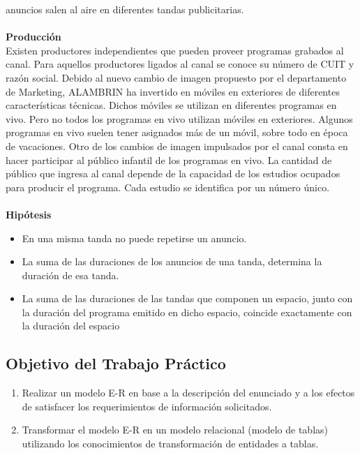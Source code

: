 \documentclass[a4paper,10pt,titlepage]{article}
\begin{document}
anuncios salen al aire en diferentes tandas publicitarias.\\
\\ \textbf{Producci\'on}\\
Existen productores independientes que pueden proveer programas grabados al canal. Para aquellos
productores ligados al canal se conoce su n\'umero de CUIT y raz\'on social.
Debido al nuevo cambio de imagen propuesto por el departamento de Marketing, ALAMBRIN ha invertido en
m\'oviles en exteriores de diferentes características t\'ecnicas. Dichos m\'oviles se utilizan en diferentes programas
en vivo. Pero no todos los programas en vivo utilizan m\'oviles en exteriores. Algunos programas en vivo suelen
tener asignados m\'as de un m\'ovil, sobre todo en \'epoca de vacaciones.
Otro de los cambios de imagen impulsados por el canal consta en hacer participar al p\'ublico infantil de los
programas en vivo. La cantidad de p\'ublico que ingresa al canal depende de la capacidad de los estudios
ocupados para producir el programa. Cada estudio se identifica por un n\'umero \'unico.\\
\\
 \textbf{Hip\'otesis}
\begin{itemize}
\item En una misma tanda no puede repetirse un anuncio.
\item La suma de las duraciones de los anuncios de una tanda, determina la duraci\'on de esa tanda.
\item La suma de las duraciones de las tandas que componen un espacio, junto con la duraci\'on del programa
emitido en dicho espacio, coincide exactamente con la duraci\'on del espacio
\end{itemize}

\subsection{Objetivo del Trabajo Pr\'actico}

\begin{enumerate}
\item Realizar un modelo E-R en base a la descripci\'on del enunciado y a los efectos de satisfacer los
requerimientos de informaci\'on solicitados.
\item Transformar el modelo E-R en un modelo relacional (modelo de tablas) utilizando los conocimientos de
transformaci\'on de entidades a tablas.
\end{enumerate}
\end{document}
